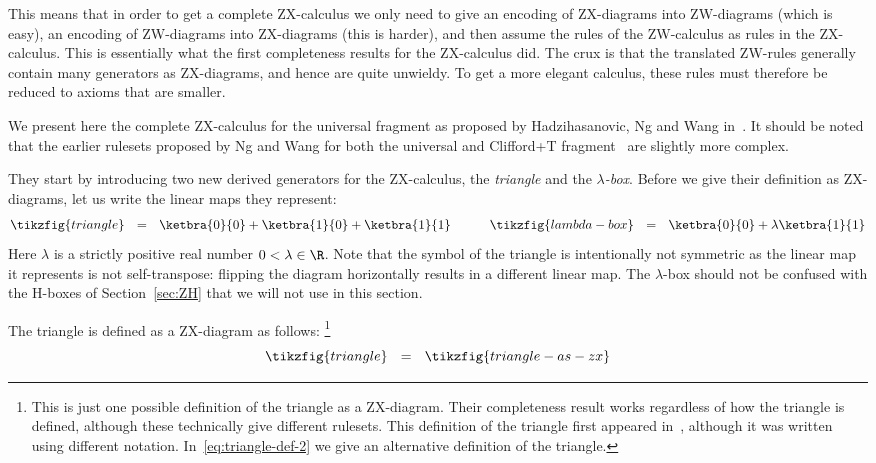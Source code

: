 \documentclass[a4paper,onecolumn,superscriptaddress,11pt,%
				unpublished,%
				allowfontchageintitle,%
				]{quantumarticle}
\begin{document}
This means that in order to get a complete ZX-calculus we only need to give an encoding of ZX-diagrams into ZW-diagrams (which is easy), an encoding of ZW-diagrams into ZX-diagrams (this is harder), and then assume the rules of the ZW-calculus as rules in the ZX-calculus. This is essentially what the first completeness results for the ZX-calculus did. The crux is that the translated ZW-rules generally contain many generators as ZX-diagrams, and hence are quite unwieldy. To get a more elegant calculus, these rules must therefore be reduced to axioms that are smaller.

We present here the complete ZX-calculus for the universal fragment as proposed by Hadzihasanovic, Ng and Wang in~\cite{HarnyAmarCompleteness}. It should be noted that the earlier rulesets proposed by Ng and Wang for both the universal and Clifford+T fragment~\cite{HarnyCompleteness,ng_completeness_2018} are slightly more complex.

They start by introducing two new derived generators for the ZX-calculus, the \emph{triangle} and the \emph{$\lambda$-box}. Before we give their definition as ZX-diagrams, let us write the linear maps they represent:
\begin{equation}
	\tikzfig{triangle} \ \ = \ \ \ketbra{0}{0} + \ketbra{1}{0} + \ketbra{1}{1} \qquad \quad \tikzfig{lambda-box} \ \ = \ \ \ketbra{0}{0} + \lambda \ketbra{1}{1}
\end{equation}
Here $\lambda$ is a strictly positive real number $0<\lambda\in \R$. Note that the symbol of the triangle is intentionally not symmetric as the linear map it represents is not self-transpose: flipping the diagram horizontally results in a different linear map. The $\lambda$-box should not be confused with the H-boxes of Section~\ref{sec:ZH} that we will not use in this section.

The triangle is defined as a ZX-diagram as follows:%
\footnote{This is just one possible definition of the triangle as a ZX-diagram. Their completeness result works regardless of how the triangle is defined, although these technically give different rulesets.
This definition of the triangle first appeared in~\cite[Exercise 12.10]{CKbook}, although it was written using different notation.
In~\eqref{eq:triangle-def-2} we give an alternative definition of the triangle.}
\begin{equation}\label{eq:triangle-def-1}
	\tikzfig{triangle} \ \ = \ \ \tikzfig{triangle-as-zx}
\end{equation}
\end{document}
